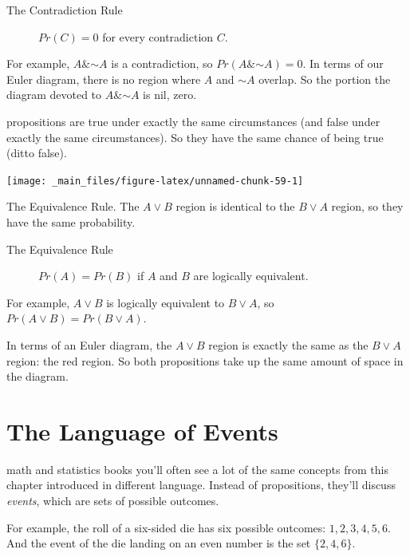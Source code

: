 \documentclass[justified]{tufte-book}
\renewcommand{\neg}{\mathbin{\sim}}
\renewcommand{\wedge}{\mathbin{\&}}
\newcommand{\p}{Pr}
\theoremstyle{definition}
\theoremstyle{definition}
\theoremstyle{definition}
\theoremstyle{remark}
\begin{document}
\begin{description}
\item[The Contradiction Rule]
\(\p(C) = 0\) for every contradiction \(C\).
\end{description}

For example, \(A \wedge \neg A\) is a contradiction, so
\(\p(A \wedge \neg A) = 0\). In terms of our Euler diagram, there is no
region where \(A\) and \(\neg A\) overlap. So the portion the diagram
devoted to \(A \wedge \neg A\) is nil, zero.

 propositions are true under exactly the same
circumstances (and false under exactly the same circumstances). So they
have the same chance of being true (ditto false).

\begin{marginfigure}
\texttt{[image: \_main\_files/figure-latex/unnamed-chunk-59-1]} \caption[The Equivalence Rule]{The Equivalence Rule. The $A \vee B$ region is identical to the $B \vee A$ region, so they have the same probability.}\label{fig:unnamed-chunk-59}
\end{marginfigure}

\begin{description}
\item[The Equivalence Rule]
\(\p(A) = \p(B)\) if \(A\) and \(B\) are logically equivalent.
\end{description}

For example, \(A \vee B\) is logically equivalent to \(B \vee A\), so
\(\p(A \vee B) = \p(B \vee A)\).

In terms of an Euler diagram, the \(A \vee B\) region is exactly the
same as the \(B \vee A\) region: the red region. So both propositions
take up the same amount of space in the diagram.

\hypertarget{the-language-of-events}{%
\section{The Language of Events}\label{the-language-of-events}}

 math and statistics books you'll often see a lot of the
same concepts from this chapter introduced in different language.
Instead of propositions, they'll discuss \emph{events}, which are sets
of possible outcomes.

For example, the roll of a six-sided die has six possible outcomes:
\(1, 2, 3, 4, 5, 6\). And the event of the die landing on an even number
is the set \(\{2, 4, 6\}\).
\end{document}
